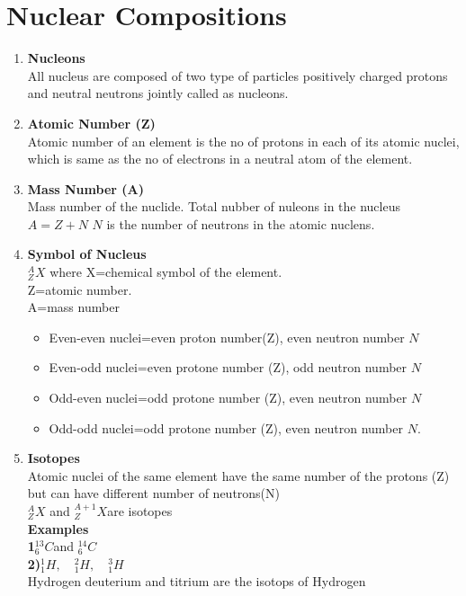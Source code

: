 \section{Nuclear Compositions}
\begin{enumerate}
\item  \textbf{Nucleons}\\All nucleus are composed of two type of particles positively charged protons and neutral neutrons jointly called as nucleons.
\item \textbf{ Atomic Number (Z)}\\
 Atomic number of an element is the no of protons in each of its atomic nuclei, which is same as the no of electrons in a neutral atom of the element.
 \item \textbf{ Mass Number (A)}\\
 Mass number of the nuclide. Total nubber of nuleons in the nucleus $A=Z+N$ $N$ is the number of neutrons in the atomic nuclens.
 \item \textbf{ Symbol of Nucleus}\\
 $^A_ZX$
 where X=chemical symbol of the element.\\
 Z=atomic number.\\
 A=mass number
 \begin{itemize}
 	\item Even-even nuclei=even proton number(Z), even neutron number $N$
 \item 	Even-odd nuclei=even protone number (Z), odd neutron number $N$
 \item 	Odd-even nuclei=odd protone number (Z), even neutron number $N$
 \item	Odd-odd nuclei=odd protone number (Z), even neutron number $N$.
 \end{itemize}
\item \textbf{Isotopes}\\
Atomic nuclei of the same element have the same number of the protons (Z) but can have different number of neutrons(N)\\
$^A_ZX$ \quad and \quad $^{A+1}_ZX$\quad  are isotopes\\
\textbf{Examples}\\
\textbf{1}\quad $^{13}_6C$\quad and \quad $^{14}_6 C$\\
\textbf{2)}\quad $^1_1H,\quad^2_1H,\quad^3_1H$\\
 Hydrogen deuterium and titrium are the isotops of Hydrogen\\
\begin{figure}[H]

\end{figure}
\end{enumerate}

